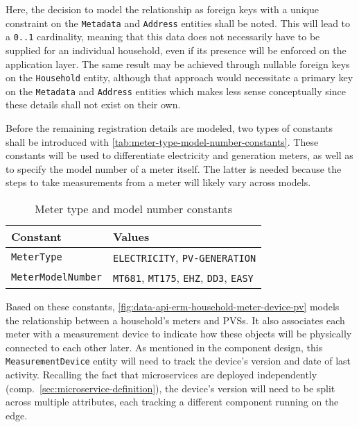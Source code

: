 \FloatBarrier

Here, the decision to model the relationship as foreign keys with a unique constraint on the \texttt{Metadata} and \texttt{Address} entities shall be noted. This will lead to a \texttt{0..1} cardinality, meaning that this data does not necessarily have to be supplied for an individual household, even if its presence will be enforced on the application layer. The same result may be achieved through nullable foreign keys on the \texttt{Household} entity, although that approach would necessitate a primary key on the \texttt{Metadata} and \texttt{Address} entities which makes less sense conceptually since these details shall not exist on their own.

Before the remaining registration details are modeled, two types of constants shall be introduced with \autoref{tab:meter-type-model-number-constants}. These constants will be used to differentiate electricity and generation meters, as well as to specify the model number of a meter itself. The latter is needed because the steps to take measurements from a meter will likely vary across models.

\begin{table}[hbt]
	\centering
  	\begin{tabularx}{\textwidth}{|l|X|}
		\hline
		\textbf{Constant} & \textbf{Values} \\
	    \hline
	    \texttt{MeterType} & \texttt{ELECTRICITY}, \texttt{PV-GENERATION} \\
		\texttt{MeterModelNumber} & \texttt{MT681}, \texttt{MT175}, \texttt{EHZ}, \texttt{DD3}, \texttt{EASY} \\
	    	\hline
	\end{tabularx}
  	\caption{Meter type and model number constants}
  	\label{tab:meter-type-model-number-constants}
\end{table}

\FloatBarrier

Based on these constants, \autoref{fig:data-api-erm-household-meter-device-pv} models the relationship between a household's meters and \acsp{PVS}. It also associates each meter with a measurement device to indicate how these objects will be physically connected to each other later. As mentioned in the component design, this \texttt{MeasurementDevice} entity will need to track the device's version and date of last activity. Recalling the fact that microservices are deployed independently (comp.~\autoref{sec:microservice-definition}), the device's version will need to be split across multiple attributes, each tracking a different component running on the edge.

